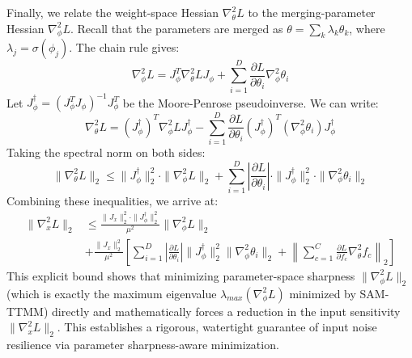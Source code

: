 \documentclass{article}
\theoremstyle{plain}
\theoremstyle{definition}
\theoremstyle{remark}
\begin{document}
Finally, we relate the weight-space Hessian $\nabla_\theta^2 L$ to the merging-parameter Hessian $\nabla_\phi^2 L$. Recall that the parameters are merged as $\theta = \sum_k \lambda_k \theta_k$, where $\lambda_j = \sigma(\phi_j)$. The chain rule gives:
\begin{equation}
    \nabla_\phi^2 L = J_\phi^T \nabla_\theta^2 L J_\phi + \sum_{i=1}^D \frac{\partial L}{\partial \theta_i} \nabla_\phi^2 \theta_i
\end{equation}
Let $J_\phi^\dagger = (J_\phi^T J_\phi)^{-1} J_\phi^T$ be the Moore-Penrose pseudoinverse. We can write:
\begin{equation}
    \nabla_\theta^2 L = (J_\phi^\dagger)^T \nabla_\phi^2 L J_\phi^\dagger - \sum_{i=1}^D \frac{\partial L}{\partial \theta_i} (J_\phi^\dagger)^T \left( \nabla_\phi^2 \theta_i \right) J_\phi^\dagger
\end{equation}
Taking the spectral norm on both sides:
\begin{equation}
    \|\nabla_\theta^2 L\|_2 \le \|J_\phi^\dagger\|_2^2 \cdot \|\nabla_\phi^2 L\|_2 + \sum_{i=1}^D \left| \frac{\partial L}{\partial \theta_i} \right| \cdot \|J_\phi^\dagger\|_2^2 \cdot \|\nabla_\phi^2 \theta_i\|_2
\end{equation}
Combining these inequalities, we arrive at:
\begin{align}
    \|\nabla_x^2 L\|_2 &\le \frac{\|J_x\|_2^2 \cdot \|J_\phi^\dagger\|_2^2}{\mu^2} \|\nabla_\phi^2 L\|_2 \nonumber \\
    &+ \frac{\|J_x\|_2^2}{\mu^2} \left[ \sum_{i=1}^D \left| \frac{\partial L}{\partial \theta_i} \right| \|J_\phi^\dagger\|_2^2 \|\nabla_\phi^2 \theta_i\|_2 + \left\| \sum_{c=1}^C \frac{\partial L}{\partial f_c} \nabla_\theta^2 f_c \right\|_2 \right]
\end{align}
This explicit bound shows that minimizing parameter-space sharpness $\|\nabla_\phi^2 L\|_2$ (which is exactly the maximum eigenvalue $\lambda_{max}(\nabla_\phi^2 L)$ minimized by SAM-TTMM) directly and mathematically forces a reduction in the input sensitivity $\|\nabla_x^2 L\|_2$. This establishes a rigorous, watertight guarantee of input noise resilience via parameter sharpness-aware minimization.
\end{document}
